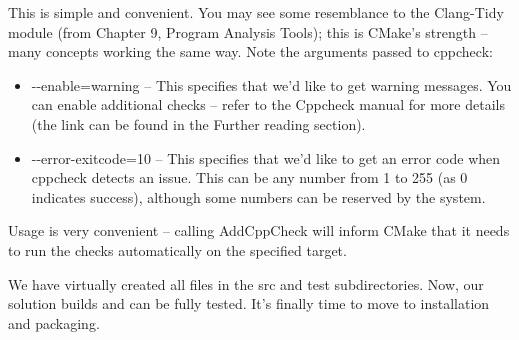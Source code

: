 This is simple and convenient. You may see some resemblance to the Clang-Tidy module (from Chapter 9, Program Analysis Tools); this is CMake's strength – many concepts working the same way. Note the arguments passed to cppcheck:

\begin{itemize}
\item 
-{}-enable=warning – This specifies that we'd like to get warning messages. You can enable additional checks – refer to the Cppcheck manual for more details (the link can be found in the Further reading section).

\item 
-{}-error-exitcode=10 – This specifies that we'd like to get an error code when cppcheck detects an issue. This can be any number from 1 to 255 (as 0 indicates success), although some numbers can be reserved by the system.
\end{itemize}

Usage is very convenient – calling AddCppCheck will inform CMake that it needs to run the checks automatically on the specified target.

We have virtually created all files in the src and test subdirectories. Now, our solution builds and can be fully tested. It's finally time to move to installation and packaging.


























